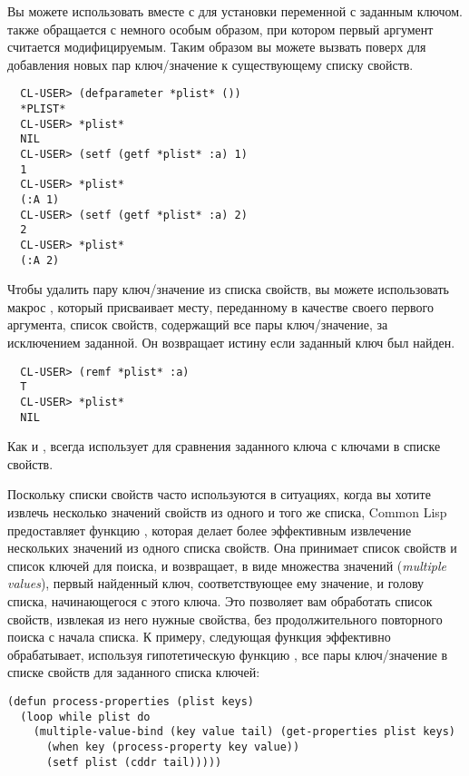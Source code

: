 Вы можете использовать  вместе с  для установки переменной с
заданным ключом.  также обращается с  немного особым образом, при
котором первый аргумент  считается модифицируемым. Таким образом вы можете
вызвать  поверх  для добавления новых пар ключ/значение к
существующему списку свойств.
  
\begin{verbatim}
  CL-USER> (defparameter *plist* ())
  *PLIST*
  CL-USER> *plist*
  NIL
  CL-USER> (setf (getf *plist* :a) 1)
  1
  CL-USER> *plist*
  (:A 1)
  CL-USER> (setf (getf *plist* :a) 2)
  2
  CL-USER> *plist*
  (:A 2)
\end{verbatim}

Чтобы удалить пару ключ/значение из списка свойств, вы можете использовать макрос
, который присваивает месту, переданному в качестве своего первого аргумента,
список свойств, содержащий все пары ключ/значение, за исключением заданной. Он возвращает
истину если заданный ключ был найден.
  
\begin{verbatim}
  CL-USER> (remf *plist* :a)
  T
  CL-USER> *plist*
  NIL
\end{verbatim}

Как и ,  всегда использует  для сравнения заданного ключа с
ключами в списке свойств.

Поскольку списки свойств часто используются в ситуациях, когда вы хотите извлечь несколько
значений свойств из одного и того же списка, Common Lisp предоставляет функцию
, которая делает более эффективным извлечение нескольких значений из
одного списка свойств. Она принимает список свойств и список ключей для поиска, и
возвращает, в виде множества значений (\textit{multiple values}), первый найденный ключ,
соответствующее ему значение, и голову списка, начинающегося с этого ключа. Это позволяет
вам обработать список свойств, извлекая из него нужные свойства, без продолжительного
повторного поиска с начала списка.  К примеру, следующая функция эффективно обрабатывает,
используя гипотетическую функцию , все пары ключ/значение в списке
свойств для заданного списка ключей:

\begin{lstlisting}
(defun process-properties (plist keys)
  (loop while plist do
	(multiple-value-bind (key value tail) (get-properties plist keys)
	  (when key (process-property key value))
	  (setf plist (cddr tail)))))
\end{lstlisting}

